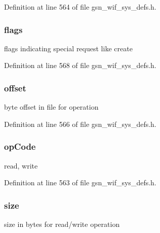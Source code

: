 Definition at line 564 of file gsn\_\-wif\_\-sys\_\-defs.h.

\hypertarget{a00351_a5a821be372043cabb6e452c3ce9bc068}{
\subsubsection[{flags}]{ {\bf flags}}}
\label{a00351_a5a821be372043cabb6e452c3ce9bc068}
flags indicating special request like create 

Definition at line 568 of file gsn\_\-wif\_\-sys\_\-defs.h.

\hypertarget{a00351_af7c1ea69079dc905761ed0a19ec036ab}{
\subsubsection[{offset}]{ {\bf offset}}}
\label{a00351_af7c1ea69079dc905761ed0a19ec036ab}
byte offset in file for operation 

Definition at line 566 of file gsn\_\-wif\_\-sys\_\-defs.h.

\hypertarget{a00351_adcf88f6496d374c89792872ab087189d}{
\subsubsection[{opCode}]{ {\bf opCode}}}
\label{a00351_adcf88f6496d374c89792872ab087189d}
read, write 

Definition at line 563 of file gsn\_\-wif\_\-sys\_\-defs.h.

\hypertarget{a00351_a68890417cb73114517d0d8c594bd282e}{
\subsubsection[{size}]{ {\bf size}}}
\label{a00351_a68890417cb73114517d0d8c594bd282e}
size in bytes for read/write operation 

